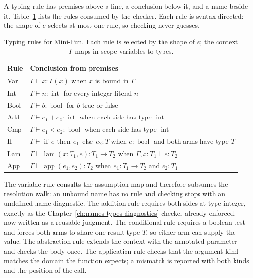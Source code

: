 A typing rule has premises above a line, a conclusion below it, and a name beside it.
Table~\ref{tab:ch39-rules} lists the rules consumed by the checker.
Each rule is syntax-directed: the shape of $e$ selects at most one rule, so checking never guesses.
\begin{table}
\caption{Typing rules for Mini-Fun. Each rule is selected by the shape of $e$; the context $\Gamma$ maps in-scope variables to types.}
\label{tab:ch39-rules}
\centering
\begin{tabular}{ll}
\toprule
Rule & Conclusion from premises \\
\midrule
Var & $\Gamma \vdash x : \Gamma(x)$ when $x$ is bound in $\Gamma$ \\
Int & $\Gamma \vdash n : \operatorname{int}$ for every integer literal $n$ \\
Bool & $\Gamma \vdash b : \operatorname{bool}$ for $b$ true or false \\
Add & $\Gamma \vdash e_1 + e_2 : \operatorname{int}$ when each side has type $\operatorname{int}$ \\
Cmp & $\Gamma \vdash e_1 < e_2 : \operatorname{bool}$ when each side has type $\operatorname{int}$ \\
If & $\Gamma \vdash \operatorname{if}\,e\,\operatorname{then}\,e_1\,\operatorname{else}\,e_2 : T$ when $e : \operatorname{bool}$ and both arms have type $T$ \\
Lam & $\Gamma \vdash \operatorname{lam}(x : T_1, e) : T_1 \to T_2$ when $\Gamma, x : T_1 \vdash e : T_2$ \\
App & $\Gamma \vdash \operatorname{app}(e_1, e_2) : T_2$ when $e_1 : T_1 \to T_2$ and $e_2 : T_1$ \\
\bottomrule
\end{tabular}
\end{table}
The variable rule consults the assumption map and therefore subsumes the resolution walk: an unbound name has no rule and checking stops with an undefined-name diagnostic.
The addition rule requires both sides at type integer, exactly as the Chapter~\ref{ch:names-types-diagnostics} checker already enforced, now written as a reusable judgment.
The conditional rule requires a boolean test and forces both arms to share one result type $T$, so either arm can supply the value.
The abstraction rule extends the context with the annotated parameter and checks the body once.
The application rule checks that the argument kind matches the domain the function expects; a mismatch is reported with both kinds and the position of the call.

